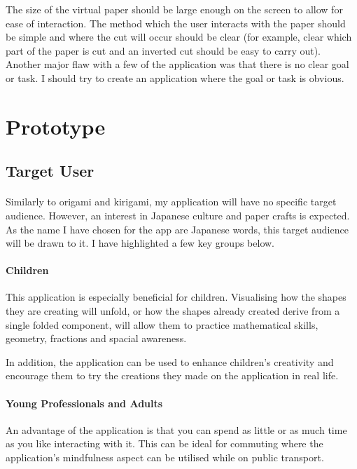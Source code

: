 \documentclass[11pt]{article}
\begin{document}
            The size of the virtual paper should be large enough on the screen to allow for ease of interaction. The method which the user interacts with the paper should be simple and where the cut will occur should be clear (for example, clear which part of the paper is cut and an inverted cut should be easy to carry out). Another major flaw with a few of the application was that there is no clear goal or task. I should try to create an application where the goal or task is obvious.


\newpage
\section{Prototype}

    \subsection{Target User}
    
            \paragraph{}
            Similarly to origami and kirigami, my application will have no specific target audience. However, an interest in Japanese culture and paper crafts is expected. As the name I have chosen for the app are Japanese words, this target audience will be drawn to it. I have highlighted a few key groups below. 
            
            \paragraph{Children}
            This application is especially beneficial for children. Visualising how the shapes they are creating will unfold, or how the shapes already created derive from a single folded component, will allow them to practice mathematical skills, geometry, fractions and spacial awareness.
            
            In addition, the application can be used to enhance children's creativity and encourage them to try the creations they made on the application in real life. 
            
            \paragraph{Young Professionals and Adults}
            An advantage of the application is that you can spend as little or as much time as you like interacting with it. This can be ideal for commuting where the application's mindfulness aspect can be utilised while on public transport.
\end{document}
